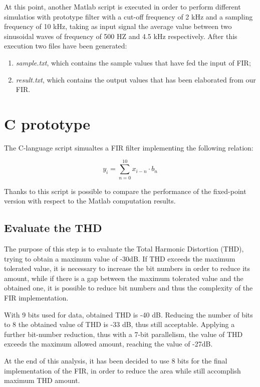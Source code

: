 At this point, another Matlab script is executed in order to perform
different simulatios with prototype filter with a cut-off frequency of 2 kHz and a sampling frequency of 10 kHz, taking as 
input signal the average value between two sinusoidal waves of frequency of 500 HZ and 4.5 kHz respectively.
After this execution two files have been generated:

\begin{enumerate}
	\item \emph{sample.txt}, which contains the sample values that have fed the input of FIR;
	\item \emph{result.txt}, which contains the output values that has been elaborated from our FIR.
\end{enumerate}

\section{C prototype}

The C-language script simualtes a FIR filter implementing the following  relation:

\begin{displaymath}
y_i = \sum_{n=0}^{10}{x_{i-n} \cdot b_n}
\end{displaymath}

Thanks to this script is possible to compare the performance of the fixed-point version with respect to 
the Matlab computation results.

\subsection{Evaluate the THD}

The purpose of this step is to evaluate the Total Harmonic Distortion (THD), trying to obtain a maximum 
value of -30dB. 
If THD exceeds the maximum tolerated value, it is necessary to increase 
the bit numbers in order to reduce its amount, while if there is a gap between the maximum tolerated value 
and the obtained one, it is possible to reduce bit numbers and thus the complexity of the FIR implementation.


With 9 bits used for data, obtained THD is -40 dB. 
Reducing the number of bits to 8 the obtained value of THD  
is -33 dB, thus still acceptable. 
Applying a further bit-number reduction, thus with a 7-bit parallelism, the value of THD exceeds the maximum allowed
amount, reaching the value of -27dB.

At the end of this analysis, it has been decided to use 8 bits for the final implementation of the  FIR, 
in order to reduce the area while still accomplish maximum THD amount.

